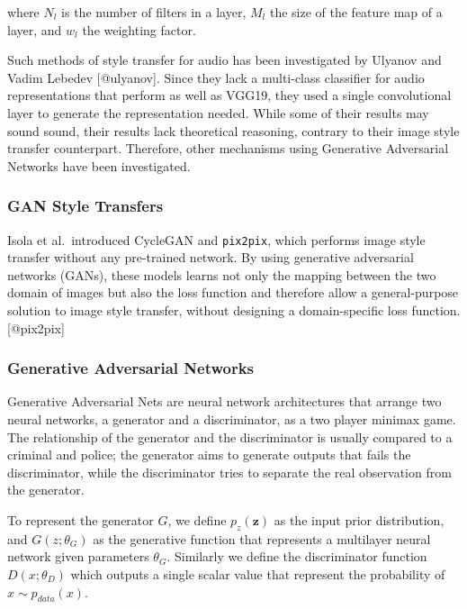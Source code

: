 \documentclass[]{article}
\begin{document}
where \(N_l\) is the number of filters in a layer, \(M_l\) the size of
the feature map of a layer, and \(w_l\) the weighting factor.

Such methods of style transfer for audio has been investigated by
Ulyanov and Vadim Lebedev {[}@ulyanov{]}. Since they lack a multi-class
classifier for audio representations that perform as well as VGG19, they
used a single convolutional layer to generate the representation needed.
While some of their results may sound sound, their results lack
theoretical reasoning, contrary to their image style transfer
counterpart. Therefore, other mechanisms using Generative Adversarial
Networks have been investigated.

\hypertarget{gan-style-transfers}{%
\subsubsection{GAN Style Transfers}\label{gan-style-transfers}}

Isola et al.~introduced CycleGAN and \texttt{pix2pix}, which performs
image style transfer without any pre-trained network. By using
generative adversarial networks (GANs), these models learns not only the
mapping between the two domain of images but also the loss function and
therefore allow a general-purpose solution to image style transfer,
without designing a domain-specific loss function. {[}@pix2pix{]}

\hypertarget{generative-adversarial-networks}{%
\subsubsection{Generative Adversarial
Networks}\label{generative-adversarial-networks}}

Generative Adversarial Nets are neural network architectures that
arrange two neural networks, a generator and a discriminator, as a two
player minimax game. The relationship of the generator and the
discriminator is usually compared to a criminal and police; the
generator aims to generate outputs that fails the discriminator, while
the discriminator tries to separate the real observation from the
generator.

To represent the generator \(G\), we define \(p_z(\mathbf{z})\) as the
input prior distribution, and \(G(z; \theta_G)\) as the generative
function that represents a multilayer neural network given parameters
\(\theta_G\). Similarly we define the discriminator function
\(D(x; \theta_D)\) which outputs a single scalar value that represent
the probability of \(x \sim p_{data}(x)\).
\end{document}
